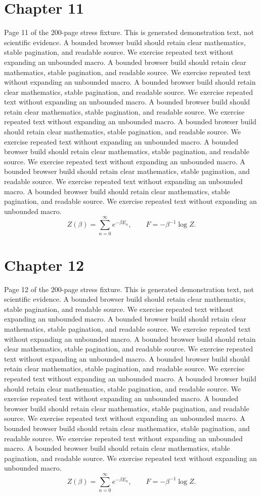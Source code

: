 \documentclass[11pt]{article}
\begin{document}
\section*{Chapter 11}
Page 11 of the 200-page stress fixture. This is generated demonstration text, not scientific evidence.
A bounded browser build should retain clear mathematics, stable pagination, and readable source. We exercise repeated text without expanding an unbounded macro.
A bounded browser build should retain clear mathematics, stable pagination, and readable source. We exercise repeated text without expanding an unbounded macro.
A bounded browser build should retain clear mathematics, stable pagination, and readable source. We exercise repeated text without expanding an unbounded macro.
A bounded browser build should retain clear mathematics, stable pagination, and readable source. We exercise repeated text without expanding an unbounded macro.
A bounded browser build should retain clear mathematics, stable pagination, and readable source. We exercise repeated text without expanding an unbounded macro.
A bounded browser build should retain clear mathematics, stable pagination, and readable source. We exercise repeated text without expanding an unbounded macro.
A bounded browser build should retain clear mathematics, stable pagination, and readable source. We exercise repeated text without expanding an unbounded macro.
A bounded browser build should retain clear mathematics, stable pagination, and readable source. We exercise repeated text without expanding an unbounded macro.
\[Z(\beta)=\sum_{n=0}^{\infty}e^{-\beta E_n},\qquad F=-\beta^{-1}\log Z.\]
\newpage
\section*{Chapter 12}
Page 12 of the 200-page stress fixture. This is generated demonstration text, not scientific evidence.
A bounded browser build should retain clear mathematics, stable pagination, and readable source. We exercise repeated text without expanding an unbounded macro.
A bounded browser build should retain clear mathematics, stable pagination, and readable source. We exercise repeated text without expanding an unbounded macro.
A bounded browser build should retain clear mathematics, stable pagination, and readable source. We exercise repeated text without expanding an unbounded macro.
A bounded browser build should retain clear mathematics, stable pagination, and readable source. We exercise repeated text without expanding an unbounded macro.
A bounded browser build should retain clear mathematics, stable pagination, and readable source. We exercise repeated text without expanding an unbounded macro.
A bounded browser build should retain clear mathematics, stable pagination, and readable source. We exercise repeated text without expanding an unbounded macro.
A bounded browser build should retain clear mathematics, stable pagination, and readable source. We exercise repeated text without expanding an unbounded macro.
A bounded browser build should retain clear mathematics, stable pagination, and readable source. We exercise repeated text without expanding an unbounded macro.
\[Z(\beta)=\sum_{n=0}^{\infty}e^{-\beta E_n},\qquad F=-\beta^{-1}\log Z.\]
\newpage
\end{document}
